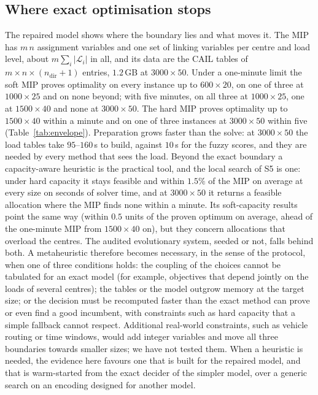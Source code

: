 \documentclass[systems,article,submit,moreauthors,pdftex]{Definitions/mdpi}
\begin{document}
\subsection{Where exact optimisation stops}\label{sec:boundary}
The repaired model shows where the boundary lies and what moves it. The MIP has
$m\,n$ assignment variables and one set of linking variables per centre and load level, about
$m \sum_i |\mathcal{L}_i|$ in all, and its data are the CAIL tables of
$m \times n \times (n_{\mathrm{dir}}+1)$ entries, $1.2$\,GB at $3000 \times 50$. Under a
one-minute limit the soft MIP proves optimality on every instance up to $600 \times 20$, on one of
three at $1000 \times 25$ and on none beyond; with five minutes, on all three at $1000 \times 25$,
one at $1500 \times 40$ and none at $3000 \times 50$. The hard MIP proves optimality up to
$1500 \times 40$ within a minute and on one of three instances at $3000 \times 50$ within five
(Table~\ref{tab:envelope}). Preparation grows faster than the solve: at $3000 \times 50$ the
load tables take $95$--$160$\,s to build, against $10$\,s for the fuzzy scores, and they are needed
by every method that sees the load. Beyond the exact boundary a capacity-aware heuristic is the
practical tool, and the local search of S5 is one: under hard capacity it stays feasible and
within $1.5\%$ of the MIP on average at every size on seconds of solver time, and at
$3000 \times 50$ it returns a feasible allocation where the MIP finds none within a minute. Its
soft-capacity results point the same way (within $0.5$ units of the proven optimum on average,
ahead of the one-minute MIP from $1500 \times 40$ on), but they concern allocations that
overload the centres. The audited evolutionary system, seeded or not, falls behind both. A metaheuristic therefore becomes necessary, in the sense of the protocol, when one
of three conditions holds: the coupling of the choices cannot be tabulated for an exact model (for
example, objectives that depend jointly on the loads of several centres); the tables or the model
outgrow memory at the target size; or the decision must be recomputed faster than the exact method
can prove or even find a good incumbent, with constraints such as hard capacity that a simple
fallback cannot respect. Additional real-world constraints, such as vehicle routing or time
windows, would add integer variables and move all three boundaries towards smaller sizes; we have not tested them. When a heuristic is needed, the evidence here favours one that is built
for the repaired model, and that is warm-started from the exact decider of the simpler model, over
a generic search on an encoding designed for another model.
\end{document}
